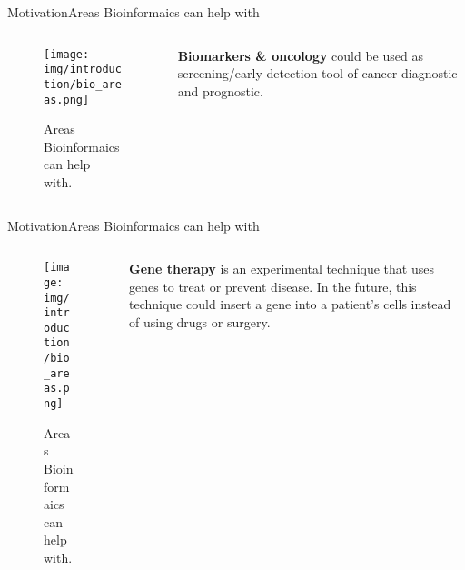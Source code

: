 \documentclass[10pt]{beamer}
\newcommand{\1}{
        	\setbeamertemplate{background}{
        		\texttt{[image: img/1]}
        		\tikz[overlay] \fill[fill opacity=0.75,fill=white] (0,0) rectangle (-\paperwidth,\paperheight);
        	}
}
\begin{document}
\begin{frame}{Motivation}{Areas Bioinformaics can help with}
	\begin{columns}
		\begin{column}{0.68\textwidth}
			
			\begin{figure}[]
				\centering
				\texttt{[image: img/introduction/bio\_areas.png]}
				\label{img:mot2}
				\caption{Areas Bioinformaics can help with.}
			\end{figure}
		\end{column}
		\begin{column}{0.28\textwidth}
			\textbf{Biomarkers \& oncology} could be used as screening/early detection tool of cancer  diagnostic and prognostic.
		\end{column}
	\end{columns}
\end{frame}


\begin{frame}{Motivation}{Areas Bioinformaics can help with}
	\begin{columns}
		\begin{column}{0.68\textwidth}
			
			\begin{figure}[]
				\centering
				\texttt{[image: img/introduction/bio\_areas.png]}
				\label{img:mot2}
				\caption{Areas Bioinformaics can help with.}
			\end{figure}
		\end{column}
		\begin{column}{0.28\textwidth}
			\textbf{Gene therapy} is an experimental technique that uses genes to treat or prevent disease. In the future, this technique could insert a gene into a patient's cells instead of using drugs or surgery.
		\end{column}
	\end{columns}
\end{frame}
\end{document}
